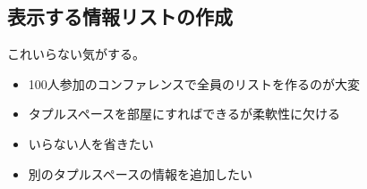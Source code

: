 \subsection{表示する情報リストの作成}

これいらない気がする。

\begin{itemize}
\item 100人参加のコンファレンスで全員のリストを作るのが大変
\item タプルスペースを部屋にすればできるが柔軟性に欠ける
\item いらない人を省きたい
\item 別のタプルスペースの情報を追加したい
\end{itemize}
